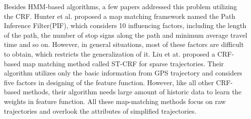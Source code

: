 Besides HMM-based algorithms, a few papers addressed this problem utilizing the
CRF. Hunter et al. proposed a map matching framework named the Path Inference
Filter(PIF)\cite{Hunter2013}, which considers 10 influencing factors, including the length of the
path, the number of stop signs along the path and minimum average travel time
and so on. However, in general situations, most of these factors are difficult to
obtain, which restricts the generalization of it.
Liu et at. proposed a CRF-based map matching method called ST-CRF \cite{liu:st-crf}for
sparse trajectories. Their algorithm utilizes only the basic information from
GPS trajectory and considers five factors in designing of the feature function.
However, like all other CRF-based methods, their algorithm needs large amount of
historic data to learn the weights in feature function.
%
All these map-matching methods focus on raw trajectories and
overlook the attributes of simplified trajectories.








